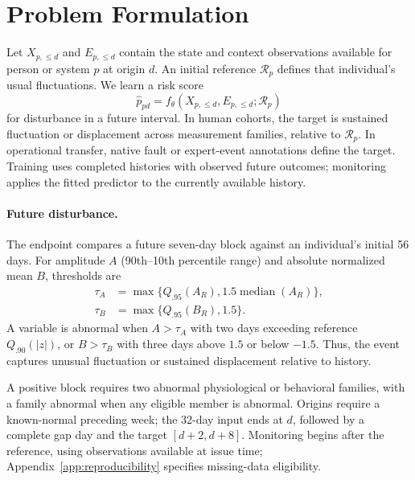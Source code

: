 \section{Problem Formulation}
\label{sec:problem}

Let $X_{p,\leq d}$ and $E_{p,\leq d}$ contain the state and context observations available for person or system $p$ at origin $d$. An initial reference $\mathcal R_p$ defines that individual's usual fluctuations. We learn a risk score
\begin{equation}
\hat p_{pd}=f_\theta(X_{p,\leq d},E_{p,\leq d};\mathcal R_p)
\end{equation}
for disturbance in a future interval. In human cohorts, the target is sustained fluctuation or displacement across measurement families, relative to $\mathcal R_p$. In operational transfer, native fault or expert-event annotations define the target. Training uses completed histories with observed future outcomes; monitoring applies the fitted predictor to the currently available history.

\paragraph{Future disturbance.}
The endpoint compares a future seven-day block against an individual's initial 56 days. For amplitude $A$ (90th--10th percentile range) and absolute normalized mean $B$, thresholds are
\begin{equation}
\begin{aligned}
\tau_A&=\max\{Q_{.95}(A_R),1.5\operatorname{median}(A_R)\},\\
\tau_B&=\max\{Q_{.95}(B_R),1.5\}.
\end{aligned}
\end{equation}
A variable is abnormal when $A>\tau_A$ with two days exceeding reference $Q_{.90}(|z|)$, or $B>\tau_B$ with three days above $1.5$ or below $-1.5$. Thus, the event captures unusual fluctuation or sustained displacement relative to history.

A positive block requires two abnormal physiological or behavioral families, with a family abnormal when any eligible member is abnormal. Origins require a known-normal preceding week; the 32-day input ends at $d$, followed by a complete gap day and the target $[d+2,d+8]$. Monitoring begins after the reference, using observations available at issue time; Appendix~\ref{app:reproducibility} specifies missing-data eligibility.


